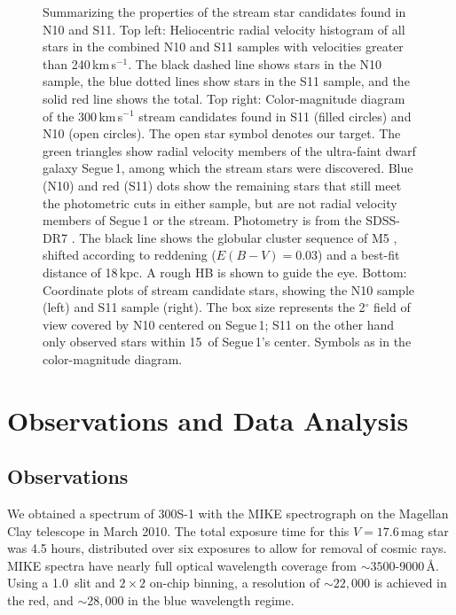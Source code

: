 \documentclass{emulateapj}
\begin{document}
\begin{figure}
\begin{center}
\begin{tabular}{cc}
  \end{tabular}
  \caption{\scriptsize Summarizing the properties of the stream star
    candidates found in N10 and S11. Top left: Heliocentric radial
    velocity histogram of all stars in the combined N10 and S11
    samples with velocities greater than 240\,km\,s$^{-1}$. The black
    dashed line shows stars in the N10 sample, the blue dotted lines
    show stars in the S11 sample, and the solid red line shows the
    total. Top right: Color-magnitude diagram of the 300\,km\,s$^{-1}$
    stream candidates found in S11 (filled circles) and N10 (open
    circles). The open star symbol denotes our target. The green
    triangles show radial velocity members of the ultra-faint dwarf
    galaxy Segue\,1, among which the stream stars were
    discovered. Blue (N10) and red (S11) dots show the remaining stars
    that still meet the photometric cuts in either sample, but are not
    radial velocity members of Segue\,1 or the stream. Photometry is
    from the SDSS-DR7 \citep{Abazajian2009}. The black line shows the
    globular cluster sequence of M5 \citep{An2008}, shifted according
    to reddening ($E(B-V)=0.03$) and a best-fit distance of 18\,kpc. A
    rough HB is shown to guide the eye. Bottom: Coordinate plots of
    stream candidate stars, showing the N10 sample (left) and S11
    sample (right). The box size represents the 2$^{\circ}$ field of
    view covered by N10 centered on Segue\,1; S11 on the other hand
    only observed stars within 15\arcmin\, of Segue\,1's
    center. Symbols as in the color-magnitude diagram.}
  \label{fig:col_mag}
 \end{center}
\end{figure}






\section{Observations and Data Analysis}
\label{sec:obs}




\subsection{Observations}

We obtained a spectrum of 300S-1 with the MIKE spectrograph \citep{mike}
on the Magellan Clay telescope in March 2010. The total exposure time for
this $V = 17.6$\,mag star was 4.5 hours, distributed over six exposures to
 allow for removal of cosmic rays. MIKE spectra have
nearly full optical wavelength coverage from $\sim3500$-9000\,{\AA}. Using
a 1.0\arcsec\, slit and $2\times2$ on-chip binning, a resolution of
$\sim22,000$ is achieved in the red, and $\sim28,000$ in the blue
wavelength regime. 
\end{document}
